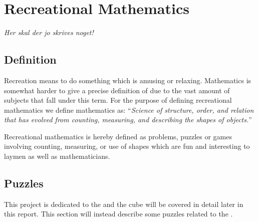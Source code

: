 \chapter{Recreational Mathematics}
\label{chap:recreationalMathematics}
\emph{Her skal der jo skrives noget!}
\section{Definition}
Recreation means to do something which is amusing or relaxing. Mathematics is somewhat harder to give a precise definition of due to the vast amount of subjects that fall under this term.
For the purpose of defining recreational mathematics we define mathematics as:
``\emph{Science of structure, order, and relation that has evolved from counting, measuring, and describing the shapes of objects.}''\cite{mathDef2}

Recreational mathematics is hereby defined as problems, puzzles or games involving counting, measuring, or use of shapes which are fun and interesting to laymen as well as mathematicians. \cite{Singmaster98} \cite[p. 18]{Trigg78}
\section{Puzzles}
This project is dedicated to the \rubik{} and the cube will be covered in detail later in this report. This section will instead describe some puzzles related to the \rubik{}.

	 
	 
	 
	
